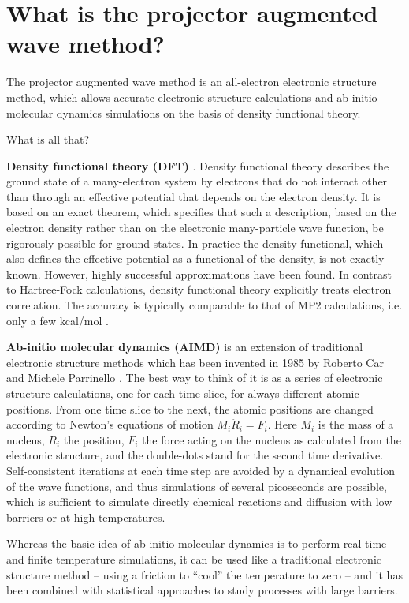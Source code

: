 \documentclass[final,12pt]{article}
\begin{document}
\section{What is the projector augmented wave method?}

The projector augmented wave method \cite{PAW} is an all-electron
electronic structure method, which allows accurate electronic
structure calculations and ab-initio molecular dynamics simulations
on the basis of density functional theory.

What is all that?

{\bf Density functional theory (DFT)} \cite{KohnSham}. Density
functional theory describes the ground state of a many-electron system
by electrons that do not interact other than through an effective
potential that depends on the electron density. It is based on an
exact theorem, which specifies that such a description, based on the
electron density rather than on the electronic many-particle
wave function, be rigorously possible for ground states. In practice the
density functional, which also defines the effective potential as a
functional of the density, is not exactly known. However, highly
successful approximations have been found. In contrast to Hartree-Fock
calculations, density functional theory explicitly treats electron
correlation. The accuracy is typically comparable to that of MP2 calculations,
i.e. only a few kcal/mol \cite{DFTBenchmarks}.

{\bf Ab-initio molecular dynamics (AIMD)} \cite{CP,CP2,Pastore,Madden}
is an extension of traditional electronic structure methods which has
been invented in 1985 by Roberto Car and Michele Parrinello \cite{CP}.
The best way to think of it is as a series of electronic structure
calculations, one for each time slice, for always different atomic
positions. From one time slice to the next, the atomic positions are
changed according to Newton's equations of motion $M_i\ddot R_i=F_i$.
Here $M_i$ is the mass of a nucleus, $R_i$ the position, $F_i$ the
force acting on the nucleus as calculated from the electronic
structure, and the double-dots stand for the second time derivative.
Self-consistent iterations at each time step are avoided by a
dynamical evolution of the wave functions, and thus simulations of
several picoseconds are possible, which is sufficient to simulate
directly chemical reactions and diffusion with low barriers or at high
temperatures.

Whereas the basic idea of ab-initio molecular dynamics is to perform
real-time and finite temperature simulations, it can be used like a
traditional electronic structure method -- using a friction to
``cool'' the temperature to zero -- and it has been combined
with statistical approaches to study processes with large barriers.
\end{document}

